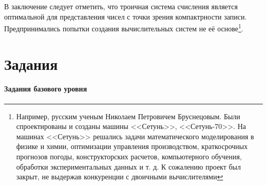 В заключение следует отметить, что троичная система счисления является оптимальной для представления чисел с точки зрения компактрности записи. Предпринимались попытки создания вычислительных систем не её основе\footnote{Например, русским ученым Николаем Петровичем Бруснецовым. Были спроектированы и созданы машины <<Сетунь>>, <<Сетунь-70>>. На машинах <<Сетунь>> решались задачи математического моделирования в физике и химии, оптимизации управления производством, краткосрочных прогнозов погоды, конструкторских расчетов, компьютерного обучения, обработки экспериментальных данных и т. д. К сожалению проект был закрыт, не выдержав конкуренции с двоичными вычислителями}.


\section*{Задания}


\paragraph{Задания базового уровня}


